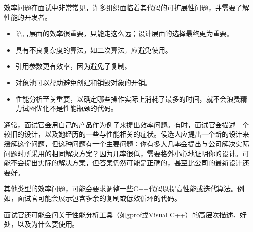 
效率问题在面试中非常常见，许多组织面临着其代码的可扩展性问题，并需要了解性能的开发者。


\begin{itemize}
\item
语言层面的效率很重要，只能走这么远；设计层面的选择最终更为重要。

\item
具有不良复杂度的算法，如二次算法，应避免使用。

\item
引用参数更有效率，因为避免了复制。

\item
对象池可以帮助避免创建和销毁对象的开销。

\item
性能分析至关重要，以确定哪些操作实际上消耗了最多的时间，就不会浪费精力试图优化不是性能瓶颈的代码。
\end{itemize}


通常，面试官会用自己的产品作为例子来提出效率问题。有时，面试官会描述一个较旧的设计，以及她经历的一些与性能相关的症状。候选人应提出一个新的设计来缓解这个问题，但这种问题有一个主要问题：你有多大几率会提出与公司解决实际问题时所采用的相同解决方案？因为几率很低，需要格外小心地证明你的设计。可能不会提出实际的解决方案，但答案仍然可能是正确的，甚至比公司的最新设计还要好。

其他类型的效率问题，可能会要求调整一些C++代码以提高性能或迭代算法。例如，面试官可能会展示包含多余的复制或低效循环的代码。

面试官还可能会问关于性能分析工具（如gprof或Visual C++）的高层次描述、好处，以及为什么要使用。







